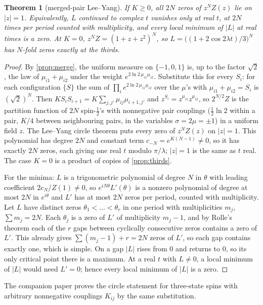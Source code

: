 \documentclass[11pt]{article}
\newtheorem{theorem}{Theorem}[section]
\theoremstyle{definition}\newtheorem{definition}[theorem]{Definition}
\theoremstyle{remark}\newtheorem{remark}[theorem]{Remark}
\begin{document}
\begin{theorem}[merged-pair Lee--Yang]\label{thm:ly}
If $K\ge0$, all $2N$ zeros of $z^NZ(z)$ lie on $|z|=1$. Equivalently, $L$ continued to complex $t$ vanishes only at real $t$, at $2N$ times per period counted with multiplicity, and every local minimum of $|L|$ at real times is a zero. At $K=0$, $z^NZ=(1+z+z^2)^N$, so $L=\bigl((1+2\cos2\lambda t)/3\bigr)^N$ has $N$-fold zeros exactly at the thirds.
\end{theorem}
\begin{proof}
By \cref{prop:merge}, the uniform measure on $\{-1,0,1\}$ is, up to the factor $\sqrt2$, the law of $\mu_{i1}+\mu_{i2}$ under the weight $e^{2\ln2\,\mu_{i1}\mu_{i2}}$. Substitute this for every $S_i$: for each configuration $\{S\}$ the sum of $\prod_ie^{2\ln2\,\mu_{i1}\mu_{i2}}$ over the $\mu$'s with $\mu_{i1}+\mu_{i2}=S_i$ is $(\sqrt2)^N$. Then $KS_iS_{i+1}=K\sum_{j,j'}\mu_{ij}\mu_{i+1,j'}$ and $z^{S_i}=z^{\mu_{i1}}z^{\mu_{i2}}$, so $2^{N/2}Z$ is the partition function of $2N$ spin-$\frac12$'s with nonnegative pair couplings ($\frac12\ln2$ within a pair, $K/4$ between neighbouring pairs, in the variables $\sigma=2\mu=\pm1$) in a uniform field $z$. The Lee--Yang circle theorem \cite{LeeYang} puts every zero of $z^NZ(z)$ on $|z|=1$. This polynomial has degree $2N$ and constant term $c_{-N}=e^{K(N-1)}\ne0$, so it has exactly $2N$ zeros, each giving one real $t$ modulo $\pi/\lambda$; $|z|=1$ is the same as $t$ real. The case $K=0$ is a product of copies of \cref{prop:thirds}.

For the minima: $L$ is a trigonometric polynomial of degree $N$ in $\theta$ with leading coefficient $2c_N/Z(1)\ne0$, so $e^{iN\theta}L'(\theta)$ is a nonzero polynomial of degree at most $2N$ in $e^{i\theta}$ and $L'$ has at most $2N$ zeros per period, counted with multiplicity. Let $L$ have distinct zeros $\theta_1<\dots<\theta_r$ in one period with multiplicities $m_j$, $\sum m_j=2N$. Each $\theta_j$ is a zero of $L'$ of multiplicity $m_j-1$, and by Rolle's theorem each of the $r$ gaps between cyclically consecutive zeros contains a zero of $L'$. This already gives $\sum(m_j-1)+r=2N$ zeros of $L'$, so each gap contains exactly one, which is simple. On a gap $|L|$ rises from $0$ and returns to $0$, so its only critical point there is a maximum. At a real $t$ with $L\ne0$, a local minimum of $|L|$ would need $L'=0$; hence every local minimum of $|L|$ is a zero.
\end{proof}
The companion paper \cite{SMath} proves the circle statement for three-state spins with arbitrary nonnegative couplings $K_{ij}$ by the same substitution.
\end{document}
